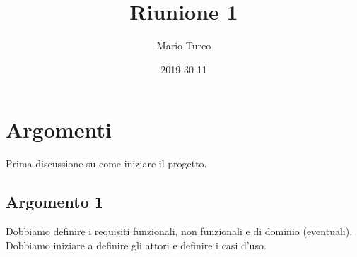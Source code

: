 \documentclass{article}
\title{Riunione 1}
\date{2019-30-11}
\author{Mario Turco}
\begin{document}
\maketitle
{}
\newpage
{}

\section{Argomenti}

Prima discussione su come iniziare il progetto.

\subsection{Argomento 1}
Dobbiamo definire i requisiti funzionali, non funzionali e di dominio (eventuali).
Dobbiamo iniziare a definire gli attori e definire i casi d'uso.
\end{document}
